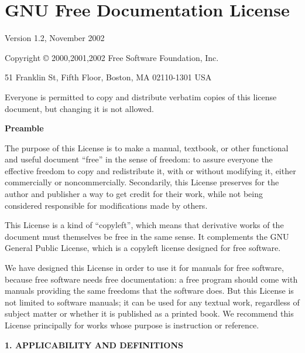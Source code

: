 \documentclass[11pt, openany]{book}
\theoremstyle{change} \theoremheaderfont{\blue\sffamily\bfseries}
\theoremstyle{nonumberplain} \theoremheaderfont{\sffamily\bfseries}
\newcommand{\í}{\'{\i}}
\begin{document}
\chapter*{GNU Free Documentation License}
{\tiny
 \begin{center}

       Version 1.2, November 2002


 Copyright \copyright{} 2000,2001,2002  Free Software Foundation, Inc.

 \bigskip

     51 Franklin St, Fifth Floor, Boston, MA  02110-1301  USA

 \bigskip

 Everyone is permitted to copy and distribute verbatim copies
 of this license document, but changing it is not allowed.
\end{center}


\begin{center}
{\bf\large Preamble}
\end{center}

The purpose of this License is to make a manual, textbook, or other
functional and useful document ``free'' in the sense of freedom: to
assure everyone the effective freedom to copy and redistribute it,
with or without modifying it, either commercially or
noncommercially. Secondarily, this License preserves for the author
and publisher a way to get credit for their work, while not being
considered responsible for modifications made by others.

This License is a kind of ``copyleft'', which means that derivative
works of the document must themselves be free in the same sense.  It
complements the GNU General Public License, which is a copyleft
license designed for free software.

We have designed this License in order to use it for manuals for
free software, because free software needs free documentation: a
free program should come with manuals providing the same freedoms
that the software does.  But this License is not limited to software
manuals; it can be used for any textual work, regardless of subject
matter or whether it is published as a printed book.  We recommend
this License principally for works whose purpose is instruction or
reference.


\begin{center}
{\Large\bf 1. APPLICABILITY AND DEFINITIONS\par} 
{}
\end{center}

}
\end{document}
